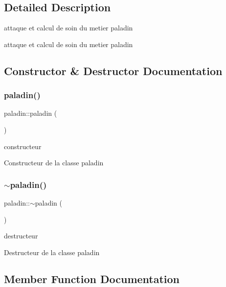 \subsection{Detailed Description}
attaque et calcul de soin du metier paladin 

attaque et calcul de soin du metier paladin 

\subsection{Constructor \& Destructor Documentation}
\mbox{\label{classpaladin_ab9bcad664a521ddc81e4acc6552edfd2}} 
\subsubsection{\texorpdfstring{paladin()}{paladin()}}
{\footnotesize\ttfamily paladin\+::paladin (\begin{DoxyParamCaption}{ }\end{DoxyParamCaption})}



constructeur 

Constructeur de la classe paladin \mbox{\label{classpaladin_a2d16bf83b24776ac60bc662f5c7593c1}} 
\subsubsection{\texorpdfstring{$\sim$paladin()}{~paladin()}}
{\footnotesize\ttfamily paladin\+::$\sim$paladin (\begin{DoxyParamCaption}{ }\end{DoxyParamCaption})}



destructeur 

Destructeur de la classe paladin 

\subsection{Member Function Documentation}
\mbox{\label{classpaladin_aae8d62c6e7c30ad1d4fbc9f147161d74}} 

